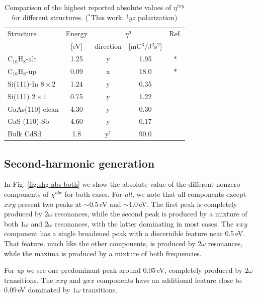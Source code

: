 \documentclass[pss]{wiley2sp} %
\begin{document}
\begin{table}%
  \sidecaption
  \begin{tabular}{lcccc}
  \hline
    Structure & Energy &  \multicolumn{2}{c}{$\eta^{a}$} &  Ref.\\
    \cline{3-4}
              & [eV]   & direction & [mC$^{3}$/J$^{2}$s$^{2}$] \\
    \hline
    C$_{16}$H$_{8}$-alt     & 1.25  & y & 1.95  & *     \\
    C$_{16}$H$_{8}$-up      & 0.09  & x & 18.0  & *     \\
    Si(111)-In $8\times2$   & 1.24  & y & 0.35  & \cite{arzate2014optical}  \\
    Si(111) $2\times1$      & 0.75  & y & 1.22  & \cite{mendoza2012optical} \\
    GaAs(110) clean         & 4.30  & y & 0.30  & \cite{nastos2007full}     \\
    GaS (110)-Sb            & 4.60  & y & 0.17  & \cite{cabellos2011optical}\\
    Bulk CdSd               & 1.8   & y$^{\dag}$ & 90.0  & \cite{nastos2006optical}  \\
  \hline
  \end{tabular}
  \caption[]{%
  Comparison of the highest reported absolute values of {$\eta^{ixy}$} for 
    different structures. ($^{*}$This work. $^{\dag}yz$ polarization)}
  \label{tab:etacomp}
\end{table}

\subsection{Second-harmonic generation}
In Fig. \ref{fig:shg-abs-both} we show the absolute value of the different
nonzero components of $\chi^{abc}$ for both cases. For \emph{alt}, we note
that all components except $xxy$ present two peaks at $\sim0.5$\,eV and
$\sim1.0$\,eV. The first peak is completely produced by $2\omega$ resonances,
while the second peak is produced by a mixture of both $1\omega$ and $2\omega$
resonances, with the latter dominating in most cases. The $xxy$ component has
a single broadened peak with a discernible feature near 0.5\,eV. That feature,
much like the other components, is produced by $2\omega$ resonances, while the
maxima is produced by a mixture of both frequencies.

For \emph{up} we see one predominant peak around 0.05\,eV, completely produced
by $2\omega$ transitions. The $xxy$ and $yxx$ components have an additional
feature close to 0.09\,eV dominated by $1\omega$ transitions.
\end{document}
